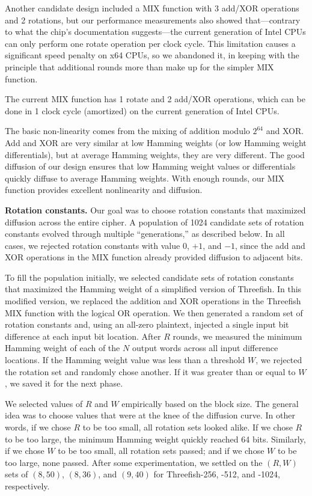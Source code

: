 \documentclass[11pt,twoside]{article}
\begin{document}
Another candidate design included a MIX function with 3 add/XOR operations and 2 rotations, but our performance measurements also showed that---contrary to what the chip's documentation suggests---the current generation of Intel CPUs can only perform one rotate operation per clock cycle.  This limitation causes a significant speed penalty on x64 CPUs, so we abandoned it, in keeping with the principle that additional rounds more than make up for the simpler MIX function.

The current MIX function has 1 rotate and 2 add/XOR operations, which can be done in 1 clock cycle (amortized) on the current generation of Intel CPUs.

The basic non-linearity comes from the mixing of addition modulo $2^{64}$ and XOR.  Add and XOR are very similar at low Hamming weights (or low Hamming weight differentials), but at average Hamming weights, they are very different. The good diffusion of our design ensures that low Hamming weight values or differentials quickly diffuse to average Hamming weights.  With enough rounds, our MIX function provides excellent nonlinearity and diffusion.

{\bf Rotation constants.} Our goal was to choose rotation constants that maximized diffusion across the entire cipher.  A population of 1024 candidate sets of rotation constants evolved through multiple ``generations,'' as described below. In all cases, we rejected rotation constants with value $0$, $+1$, and $-1$, since the add and XOR operations in the MIX function already provided diffusion to adjacent bits.

To fill the population initially, we selected candidate sets of rotation constants that maximized the Hamming weight of a simplified version of Threefish.  In this modified version, we replaced the addition and XOR operations in the Threefish MIX function with the logical OR operation.  We then generated a random set of rotation constants and, using an all-zero plaintext, injected a single input bit difference at each input bit location.  After $R$ rounds, we measured the minimum Hamming weight of each of the $N$ output words across all input difference locations.  If the Hamming weight value was less than a threshold $W$, we rejected the rotation set and randomly chose another.  If it was greater than or equal to $W$, we saved it for the next phase.

We selected values of $R$ and $W$ empirically based on the block
size.  The general idea was to choose values that were at the knee of
the diffusion curve.  In other words, if we chose $R$ to be too
small, all rotation sets looked alike.  If we chose $R$ to be too
large, the minimum Hamming weight quickly reached 64 bits.
Similarly, if we chose $W$ to be too small, all rotation sets passed;
and if we chose $W$ to be too large, none passed.  After some experimentation, we settled on the $(R,W)$ sets of $(8,50)$, $(8,36)$, and $(9,40)$ for Threefish-256, -512, and -1024, respectively.
\end{document}
